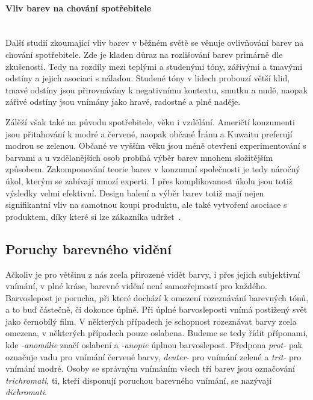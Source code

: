 \paragraph{Vliv barev na chování spotřebitele}\mbox{}\\
Další studií zkoumající vliv barev v běžném světě se věnuje ovlivňování barev na chování spotřebitele. Zde je kladen důraz na rozlišování
barev primárně dle zkušenosti. Tedy na rozdíly mezi teplými a studenými tóny, zářivými a tmavými odstíny a jejich asociaci s náladou. 
Studené tóny v lidech probouzí větší klid, tmavé odstíny jsou přirovnávány k negativnímu kontextu, smutku a nudě, naopak zářivé odstíny jsou vnímány jako hravé, 
radostné a plné naděje.

Zálěží však také na původu spotřebitele, věku i vzdělání. Američtí konzumenti jsou přitahování k modré a červené, naopak občané Íránu a Kuwaitu
preferují modrou se zelenou. Občané ve vyšším věku jsou méně otevřeni experimentování s barvami a u vzdělanějších osob probíhá výběr barev mnohem složitějším
způsobem. Zakomponování teorie barev v konzumní společnosti je tedy náročný úkol, kterým se zabívají mnozí experti. I přes komplikovanost úkolu
jsou totiž výsledky velmi efektivní. Design balení a výběr barev totiž mají nejen signifikantní vliv na samotnou koupi produktu, ale také vytvoření asociace
s produktem, díky které si lze zákazníka udržet~\cite{consumer-behavior}.

\subsection{Poruchy barevného vidění}
Ačkoliv je pro většinu z nás zcela přirozené vidět barvy, i přes jejich subjektivní vnímání, v plné kráse, barevné vidění není samozřejmostí pro každého.
Barvoslepost je porucha, při které dochází k omezení rozeznávání barevných tónů, a to buď částečně, či dokonce úplně. Při úplné barvosleposti vnímá postižený svět
jako černobílý film. V některých případech je schopnost rozeznávat barvy zcela omezena, v některých případech pouze oslabena. Budeme se tedy řídit příponami, kde
\emph{-anomálie} značí oslabení a \emph{-anopie} úplnou barvoslepost. Předpona \emph{prot-} pak označuje vadu pro vnímání červené barvy, \emph{deuter-} pro vnímání zelené a \emph{trit- }
pro vnímání modré. Osoby se správným vnímáním všech tří barev jsou označování \emph{trichromati}, ti, kteří disponují poruchou barevného vnímání, se nazývají \emph{dichromati}.
